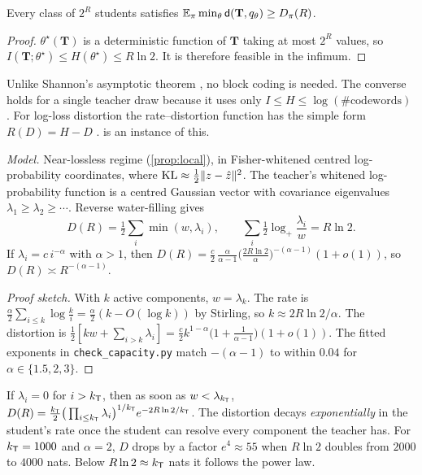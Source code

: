 \begin{theorem}\label{thm:rd}
\Pv Every class of $2^R$ students satisfies $\mathbb{E}_\pi\min_\theta\mathsf d(\mathbf T,q_\theta)\ge D_\pi(R)$.
\end{theorem}
\begin{proof}
$\theta^\star(\mathbf T)$ is a deterministic function of $\mathbf T$ taking at most $2^R$ values, so
$I(\mathbf T;\theta^\star)\le H(\theta^\star)\le R\ln2$. It is therefore feasible in the infimum.
\end{proof}
\noindent
Unlike Shannon's asymptotic theorem \citep{shannon1959coding}, no block coding is needed. The converse
holds for a single teacher draw because it uses only $I\le H\le\log(\#\text{codewords})$
\citep{cover2006elements,polyanskiy2024information}. For log-loss distortion the rate--distortion
function has the simple form $R(D)=H-D$ \citep{courtade2014multiterminal}.  is an
instance of this.

\begin{proposition}\label{prop:powerlaw}
\Mo\Ck \emph{Model.} Near-lossless regime (\cref{prop:local}), in Fisher-whitened centred
log-probability coordinates, where $\mathrm{KL}\approx\frac12\|z-\hat z\|^2$. The teacher's whitened
log-probability function is a centred Gaussian vector with covariance eigenvalues $\lambda_1\ge\lambda_2\ge\cdots$.
Reverse water-filling \citep[Thm.~10.3.3]{cover2006elements} gives
\[
D(R)=\tfrac12\sum_i\min(w,\lambda_i),\qquad\sum_i\tfrac12\log_+\frac{\lambda_i}w=R\ln2 .
\]
If $\lambda_i=c\,i^{-\alpha}$ with $\alpha>1$, then
$D(R)=\frac c2\,\frac\alpha{\alpha-1}\big(\tfrac{2R\ln2}\alpha\big)^{-(\alpha-1)}(1+o(1))$, so $D(R)\asymp R^{-(\alpha-1)}$.
\end{proposition}
\begin{proof}[Proof sketch]
With $k$ active components, $w=\lambda_k$. The rate is
$\frac\alpha2\sum_{i\le k}\log\frac ki=\frac{\alpha}2(k-O(\log k))$ by Stirling, so $k\approx2R\ln2/\alpha$. The
distortion is $\frac12[kw+\sum_{i>k}\lambda_i]=\frac c2k^{1-\alpha}\big(1+\frac1{\alpha-1}\big)(1+o(1))$.
The fitted exponents in \texttt{check\_capacity.py} match $-(\alpha-1)$ to within $0.04$ for
$\alpha\in\{1.5,2,3\}$.
\end{proof}

\begin{proposition}\label{prop:phase}
\Mo\Ck If $\lambda_i=0$ for $i>k_{\mathsf{T}}$, then as soon as $w<\lambda_{k_{\mathsf{T}}}$,
$D(R)=\frac{k_{\mathsf{T}}}2\big(\prod_{i\le k_{\mathsf{T}}}\lambda_i\big)^{1/k_{\mathsf{T}}}e^{-2R\ln2/k_{\mathsf{T}}}$. The distortion decays
\emph{exponentially} in the student's rate once the student can resolve every component the teacher has.
For $k_{\mathsf{T}}=1000$ and $\alpha=2$, $D$ drops by a factor $e^{4}\approx55$ when $R\ln2$ doubles from $2000$ to
$4000$ nats. Below $R\ln2\approx k_{\mathsf{T}}$ nats it follows the power law.
\end{proposition}

